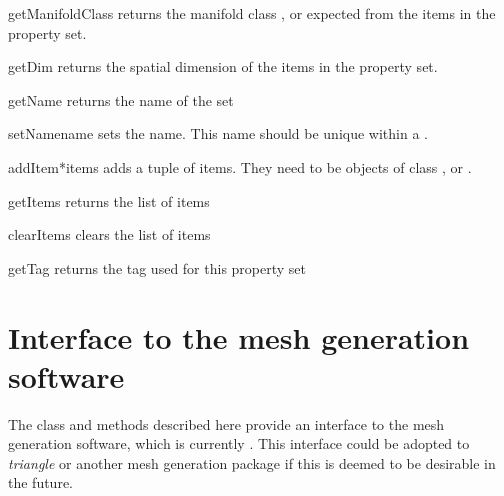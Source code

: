 \begin{methoddesc}[PropertySet]{getManifoldClass}{}
returns the manifold class \ManifoldOneD, \ManifoldTwoD or \ManifoldThreeD
expected from the items in the property set.
\end{methoddesc}

\begin{methoddesc}[PropertySet]{getDim}{}
returns the spatial dimension of the items in the property set.
\end{methoddesc}

\begin{methoddesc}[PropertySet]{getName}{}
returns the name of the set
\end{methoddesc}

\begin{methoddesc}[PropertySet]{setName}{name}
sets the name. This name should be unique within a \Design.
\end{methoddesc}

\begin{methoddesc}[PropertySet]{addItem}{*items}
adds a tuple of items. They need to be objects of class \ManifoldOneD,
\ManifoldTwoD or \ManifoldThreeD.
\end{methoddesc}

\begin{methoddesc}[PropertySet]{getItems}{}
returns the list of items
\end{methoddesc}

\begin{methoddesc}[PropertySet]{clearItems}{}
clears the list of items
\end{methoddesc}

\begin{methoddesc}[PropertySet]{getTag}{}
returns the tag used for this property set
\end{methoddesc}

\section{Interface to the mesh generation software}

The class and methods described here provide an interface to the mesh
generation software, which is currently \gmshextern. This interface could be
adopted to \emph{triangle} or another mesh generation package if this is
deemed to be desirable in the future.

